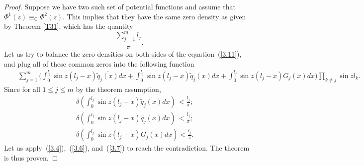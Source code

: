 \documentclass[10pt,a4paper]{amsart}
\begin{document}
\begin{proof}
Suppose we have two such set of potential functions  and assume that $\Phi^{1}(z)\equiv_{\mathbb{C}}\Phi^{2}(z)$.  This implies that they have the same zero density as given by Theorem \ref{T31}, which has the quantity
 $$\frac{\sum_{j=1}^{m}l_{j}}{\pi}.$$
Let us try to balance the zero densities on both sides of the equation~(\ref{3.11}), and  plug all of these common zeros into the following function
\begin{eqnarray}\nonumber
&&\sum_{j=1}^{m}\Big(\int_{0}^{l_{j}}\sin{z(l_{j}-x)}\overline{\widetilde{q}_{j}(x)}dx+\int_{0}^{l_{j}}\sin{z(l_{j}-x)}\widetilde{q}_{j}(x)dx+\int_{0}^{l_{j}}\sin{z(l_{j}-x)}G_{j}(x)dx\Big) \prod_{k\neq j}\sin{z l_{k}}.
\end{eqnarray}
Since for all $1\leq j\leq m$ by the theorem assumption,
\begin{eqnarray}
&&\delta(\int_{0}^{l_{j}}\sin{z(l_{j}-x)}\overline{\widetilde{q}_{j}(x)}dx)\,<\frac{l_{j}}{\pi};\\
&&\delta(\int_{0}^{l_{j}}\sin{z(l_{j}-x)}\widetilde{q}_{j}(x)dx)\,<\frac{l_{j}}{\pi};\\
&&\delta(\int_{0}^{l_{j}}\sin{z(l_{j}-x)}G_{j}(x)dx)<\frac{l_{j}}{\pi}.
\end{eqnarray}
Let us apply~(\ref{3.4}),~(\ref{3.6}), and~(\ref{3.7}) to reach the contradiction. The theorem is thus proven.

\end{proof}
\end{document}
